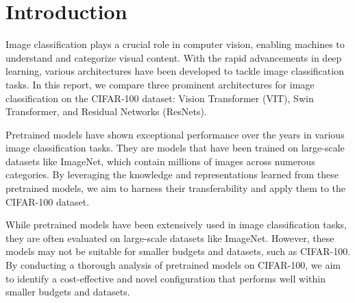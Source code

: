 \documentclass{article}
\begin{document}
\section{Introduction}
Image classification plays a crucial role in computer vision, enabling machines to understand and categorize visual content.
With the rapid advancements in deep learning, various architectures have been developed to tackle image classification tasks.
In this report, we compare three prominent architectures for image classification on the CIFAR-100 dataset: Vision Transformer (VIT), Swin Transformer, and Residual Networks (ResNets).




Pretrained models have shown exceptional performance over the years in various image classification tasks. They are models that have been trained on large-scale datasets like ImageNet, which contain millions of images across numerous categories.
By leveraging the knowledge and representations learned from these pretrained models, we aim to harness their transferability and apply them to the CIFAR-100 dataset.



While pretrained models have been extensively used in image classification tasks, they are often evaluated on large-scale datasets like ImageNet. However, these models may not be suitable for smaller budgets and datasets, such as CIFAR-100. By conducting a thorough analysis of pretrained models on CIFAR-100, we aim to identify a cost-effective and novel configuration that performs well within smaller budgets and datasets.
\end{document}
